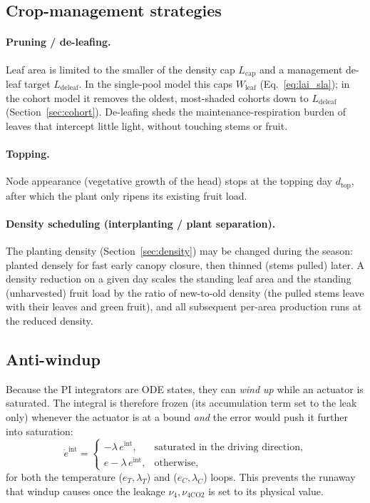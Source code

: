 \documentclass[11pt,a4paper]{article}
\begin{document}
\subsection{Crop-management strategies}\label{sec:cropmgmt}
\paragraph{Pruning / de-leafing.}\label{sec:pruning} Leaf area is limited to the smaller of the
density cap $L_{\text{cap}}$ and a management de-leaf target $L_{\text{deleaf}}$. In the single-pool
model this caps $W_{\text{leaf}}$ (Eq.~\eqref{eq:lai_sla}); in the cohort model it removes the oldest,
most-shaded cohorts down to $L_{\text{deleaf}}$ (Section~\ref{sec:cohort}). De-leafing sheds the
maintenance-respiration burden of leaves that intercept little light, without touching stems or fruit.
\paragraph{Topping.} Node appearance (vegetative growth of the head) stops at the topping day
$d_{\text{top}}$, after which the plant only ripens its existing fruit load.
\paragraph{Density scheduling (interplanting / plant separation).} The planting density
(Section~\ref{sec:density}) may be changed during the season: planted densely for fast early canopy
closure, then thinned (stems pulled) later. A density reduction on a given day scales the standing
leaf area and the standing (unharvested) fruit load by the ratio of new-to-old density (the pulled
stems leave with their leaves and green fruit), and all subsequent per-area production runs at the
reduced density.

\subsection{Anti-windup}\label{sec:windup}
Because the PI integrators are ODE states, they can \emph{wind up} while an actuator is saturated. The
integral is therefore frozen (its accumulation term set to the leak only) whenever the actuator is at
a bound \emph{and} the error would push it further into saturation:
\begin{equation}
  \dot{e}^{\text{int}} = \begin{cases}
    -\lambda\,e^{\text{int}}, & \text{saturated in the driving direction},\\
    e - \lambda\,e^{\text{int}}, & \text{otherwise},
  \end{cases}
\end{equation}
for both the temperature ($e_T,\lambda_T$) and  ($e_C,\lambda_C$) loops. This prevents the
runaway that windup causes once the leakage $\nu_4,\nu_{4\text{CO2}}$ is set to its physical value.
\end{document}
